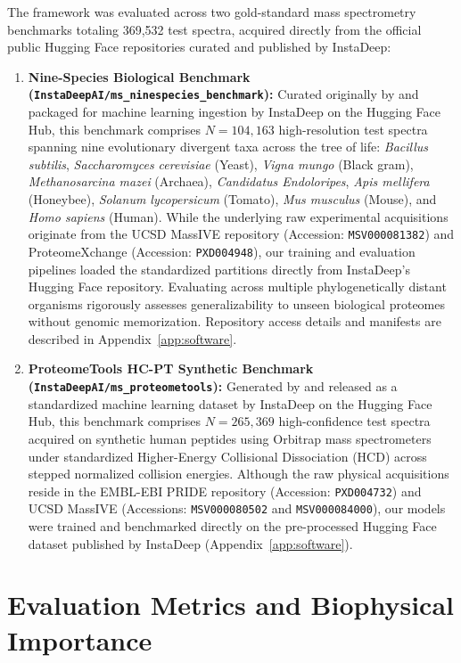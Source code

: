 The framework was evaluated across two gold-standard mass spectrometry benchmarks totaling 369,532 test spectra, acquired directly from the official public Hugging Face repositories curated and published by InstaDeep:
\begin{enumerate}[(1)]
\item \textbf{Nine-Species Biological Benchmark (\texttt{InstaDeepAI/ms\_ninespecies\_benchmark}):} Curated originally by \citet{Tran2017} and packaged for machine learning ingestion by InstaDeep on the Hugging Face Hub, this benchmark comprises $N = 104,163$ high-resolution test spectra spanning nine evolutionary divergent taxa across the tree of life: \emph{Bacillus subtilis}, \emph{Saccharomyces cerevisiae} (Yeast), \emph{Vigna mungo} (Black gram), \emph{Methanosarcina mazei} (Archaea), \emph{Candidatus Endoloripes}, \emph{Apis mellifera} (Honeybee), \emph{Solanum lycopersicum} (Tomato), \emph{Mus musculus} (Mouse), and \emph{Homo sapiens} (Human). While the underlying raw experimental acquisitions originate from the UCSD MassIVE repository (Accession: \texttt{MSV000081382}) and ProteomeXchange (Accession: \texttt{PXD004948}), our training and evaluation pipelines loaded the standardized partitions directly from InstaDeep's Hugging Face repository. Evaluating across multiple phylogenetically distant organisms rigorously assesses generalizability to unseen biological proteomes without genomic memorization. Repository access details and manifests are described in Appendix~\ref{app:software}.
\item \textbf{ProteomeTools HC-PT Synthetic Benchmark (\texttt{InstaDeepAI/ms\_proteometools}):} Generated by \citet{Zolg2017} and released as a standardized machine learning dataset by InstaDeep on the Hugging Face Hub, this benchmark comprises $N = 265,369$ high-confidence test spectra acquired on synthetic human peptides using Orbitrap mass spectrometers \citep{Makarov2000, Zubarev2007} under standardized Higher-Energy Collisional Dissociation (HCD) \citep{Olsen2007} across stepped normalized collision energies. Although the raw physical acquisitions reside in the EMBL-EBI PRIDE repository (Accession: \texttt{PXD004732}) and UCSD MassIVE (Accessions: \texttt{MSV000080502} and \texttt{MSV000084000}), our models were trained and benchmarked directly on the pre-processed Hugging Face dataset published by InstaDeep (Appendix~\ref{app:software}).
\end{enumerate}

\section{Evaluation Metrics and Biophysical Importance}

